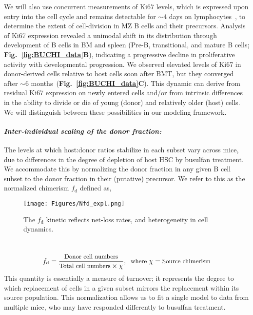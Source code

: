 \documentclass[11pt]{article}
\newcommand{\para}[1]{\vspace*{-4.5mm}\paragraph{#1}}
\begin{document}
We will also use concurrent measurements of Ki67 levels, which is expressed upon entry into the cell cycle and remains detectable for $\sim$4 days on lymphocytes~\cite{Gossel_2017, Verheijen_2020}, to determine the extent of cell-division in MZ B cells and their precursors.
Analysis of Ki67 expression revealed a unimodal shift in its distribution through development of B cells in BM and spleen (Pre-B, transitional, and mature B cells; \textbf{Fig.~\ref{fig:BUCHI_data}B}), indicating a progressive decline in proliferative activity with developmental progression.
We observed elevated levels of Ki67 in donor-derived cells relative to host cells soon after BMT, but they converged after $\sim$6 months~(\textbf{Fig.~\ref{fig:BUCHI_data}C}).
This dynamic can derive from residual Ki67 expression on newly entered cells and/or from intrinsic differences in the ability to divide or die of young (donor) and relatively older (host) cells.
We will distinguish between these possibilities in our modeling framework.

\para{\textit{Inter-individual scaling of the donor fraction:}}
The levels at which host:donor ratios stabilize in each subset vary across mice, due to differences in the degree of depletion of host HSC by busulfan treatment. We accommodate this by normalizing the donor fraction in any given B cell subset to the donor fraction in their (putative) precursor. We refer to this as the normalized chimerism $f_\text{d}$ defined as,

\begin{wrapfigure}{r}{0.25\textwidth}
\centering
\vspace*{-10mm}
\texttt{[image: Figures/Nfd\_expl.png]}
\vspace*{-7mm}
\caption{{The $f_\text{d}$ kinetic  reflects net-loss rates, and heterogeneity in cell dynamics.}}%
\label{fig:Repop}
\vspace*{-3mm}
\end{wrapfigure}
~
\begin{equation}
\small
f_\text{d} = \frac{\text{Donor cell numbers}}{\text{Total cell numbers} \times \chi}, \;\; \text{where } \chi  =\text{Source chimerism}
\label{eq:Nfd}
\end{equation}
This quantity is essentially a measure of turnover; it  represents the degree to which replacement of cells in a given subset mirrors the replacement within its source population.
This normalization allows us to fit a single model to data from multiple mice, who may have responded differently to busulfan treatment.
\end{document}
